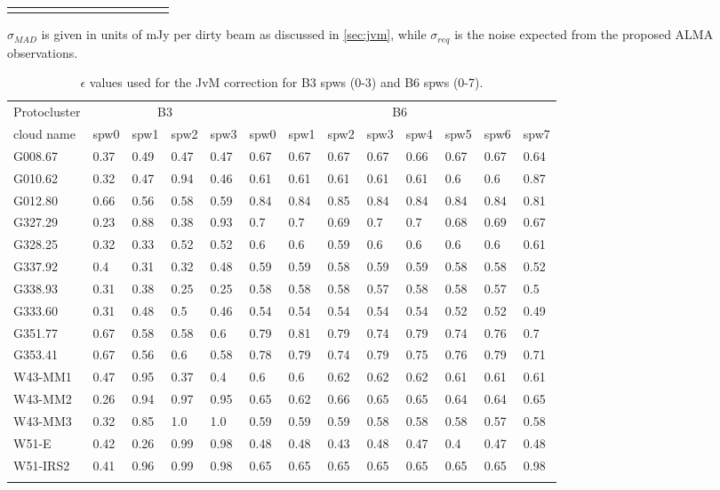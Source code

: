 \documentclass[longauth]{aa} %
\newcommand{\tdust}{\mbox{$T_{\rm dust}$}}
\newcommand{\lbol}{\ensuremath{L_{\mathrm{bol}}\xspace}}        %
\begin{document}
\begin{appendix}
\begin{table}[htbp!]
\begin{tabular}{@{\extracolsep{4pt}}lllllllllllll@{}}
\hline \noalign {\smallskip}
\end{tabular}
\begin{tablenotes}
\item $\sigma_{MAD}$ is given in units of mJy per dirty beam as discussed in \cref{sec:jvm}, while $\sigma_{req}$ is the noise expected from the proposed ALMA observations.

\end{tablenotes}
\end{table}

\begin{table}[htbp!]
\centering
\caption{\label{appendix:tab:epsilon} $\epsilon$ values used for the JvM correction for B3 spws (0-3) and B6 spws (0-7). }
\begin{tabular}{@{\extracolsep{6pt}}lllllllllllll@{}}
 \hline \noalign {\smallskip}
 Protocluster  & \multicolumn{4}{c}{B3 }& \multicolumn{8}{c}{B6} \\ %
 \cline{2-5} \cline{6-13}
cloud name & spw0& spw1  & spw2 & spw3 & spw0  & spw1  & spw2 & spw3 & spw4 & spw5 & spw6 & spw7 \\
\hline \noalign {\smallskip}
G008.67 & 0.37&0.49&0.47&0.47 & 0.67&0.67&0.67&0.67&0.66&0.67&0.67&0.64 \\
G010.62 & 0.32&0.47&0.94&0.46 & 0.61&0.61&0.61&0.61&0.61&0.6&0.6&0.87 \\
G012.80 & 0.66&0.56&0.58&0.59 & 0.84&0.84&0.85&0.84&0.84&0.84&0.84&0.81 \\
G327.29 & 0.23&0.88&0.38&0.93 & 0.7&0.7&0.69&0.7&0.7&0.68&0.69&0.67 \\
G328.25 & 0.32&0.33&0.52&0.52 & 0.6&0.6&0.59&0.6&0.6&0.6&0.6&0.61 \\
G337.92 & 0.4&0.31&0.32&0.48 & 0.59&0.59&0.58&0.59&0.59&0.58&0.58&0.52 \\
G338.93 & 0.31&0.38&0.25&0.25 & 0.58&0.58&0.58&0.57&0.58&0.58&0.57&0.5 \\
G333.60 & 0.31&0.48&0.5&0.46 & 0.54&0.54&0.54&0.54&0.54&0.52&0.52&0.49 \\
G351.77 & 0.67&0.58&0.58&0.6 & 0.79&0.81&0.79&0.74&0.79&0.74&0.76&0.7 \\
G353.41 & 0.67&0.56&0.6&0.58 & 0.78&0.79&0.74&0.79&0.75&0.76&0.79&0.71 \\
W43-MM1 & 0.47&0.95&0.37&0.4 & 0.6&0.6&0.62&0.62&0.62&0.61&0.61&0.61 \\
W43-MM2 & 0.26&0.94&0.97&0.95 & 0.65&0.62&0.66&0.65&0.65&0.64&0.64&0.65 \\
W43-MM3 & 0.32&0.85&1.0&1.0 & 0.59&0.59&0.59&0.58&0.58&0.58&0.57&0.58 \\
W51-E & 0.42&0.26&0.99&0.98 & 0.48&0.48&0.43&0.48&0.47&0.4&0.47&0.48 \\
W51-IRS2 & 0.41&0.96&0.99&0.98 & 0.65&0.65&0.65&0.65&0.65&0.65&0.65&0.98 \\
\hline \noalign {\smallskip}
\end{tabular}
\end{table}

\end{appendix}
\end{document}
